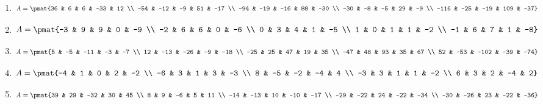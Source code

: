 \begin{enumerate}
\item

\begin{align*}
A = \pmat{36 & 6 & 6 & -33 & 12 \\ -54 & -12 & -9 & 51 & -17 \\ -94 & -19 & -16 & 88 & -30 \\ -30 & -8 & -5 & 29 & -9 \\ -116 & -25 & -19 & 109 & -37}
\end{align*}

\item

\begin{align*}
A = \pmat{-3 & 9 & 9 & 0 & -9 \\ -2 & 6 & 6 & 0 & -6 \\ 0 & 3 & 4 & 1 & -5 \\ 1 & 0 & 1 & 1 & -2 \\ -1 & 6 & 7 & 1 & -8}
\end{align*}

\item

\begin{align*}
A = \pmat{5 & -5 & -11 & -3 & -7 \\ 12 & -13 & -26 & -9 & -18 \\ -25 & 25 & 47 & 19 & 35 \\ -47 & 48 & 93 & 35 & 67 \\ 52 & -53 & -102 & -39 & -74}
\end{align*}

\item

\begin{align*}
A = \pmat{-4 & 1 & 0 & 2 & -2 \\ -6 & 3 & 1 & 3 & -3 \\ 8 & -5 & -2 & -4 & 4 \\ -3 & 3 & 1 & 1 & -2 \\ 6 & 3 & 2 & -4 & 2}
\end{align*}

\item

\begin{align*}
A = \pmat{39 & 29 & -32 & 30 & 45 \\ 8 & 9 & -6 & 5 & 11 \\ -14 & -13 & 10 & -10 & -17 \\ -29 & -22 & 24 & -22 & -34 \\ -30 & -26 & 23 & -22 & -36}
\end{align*}


\end{enumerate}
